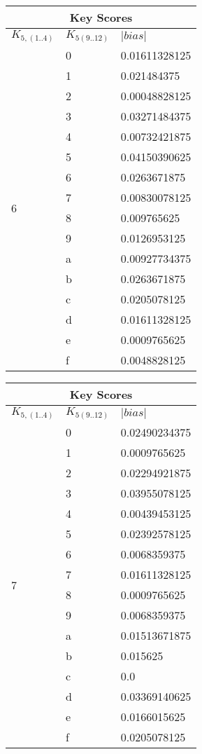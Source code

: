 \documentclass{elsart}
\begin{document}
\begin{tabular}{|l|l|l|}
\hline
\multicolumn{3}{|c|}{Key Scores} \\
\hline
$K_{5,(1..4)}$ & $K_{5(9..12)}$ & $|bias|$  \\ \hline
 \multirow{16}{*}{6} & 0 & 0.01611328125 \\
 & 1 & 0.021484375 \\
 & 2 & 0.00048828125 \\
 & 3 & 0.03271484375 \\
 & 4 & 0.00732421875 \\
 & 5 & 0.04150390625 \\
 & 6 & 0.0263671875 \\
 & 7 & 0.00830078125 \\
 & 8 & 0.009765625 \\
 & 9 & 0.0126953125 \\
 & a & 0.00927734375 \\
 & b & 0.0263671875 \\
 & c & 0.0205078125 \\
 & d & 0.01611328125 \\
 & e & 0.0009765625 \\
 & f & 0.0048828125 \\ \hline
\end{tabular}
\begin{tabular}{|l|l|l|}
\hline
\multicolumn{3}{|c|}{Key Scores} \\
\hline
$K_{5,(1..4)}$ & $K_{5(9..12)}$ & $|bias|$  \\ \hline
 \multirow{16}{*}{7} & 0 & 0.02490234375 \\
 & 1 & 0.0009765625 \\
 & 2 & 0.02294921875 \\
 & 3 & 0.03955078125 \\
 & 4 & 0.00439453125 \\
 & 5 & 0.02392578125 \\
 & 6 & 0.0068359375 \\
 & 7 & 0.01611328125 \\
 & 8 & 0.0009765625 \\
 & 9 & 0.0068359375 \\
 & a & 0.01513671875 \\
 & b & 0.015625 \\
 & c & 0.0 \\
 & d & 0.03369140625 \\
 & e & 0.0166015625 \\
 & f & 0.0205078125 \\ \hline
\end{tabular}
\end{document}
